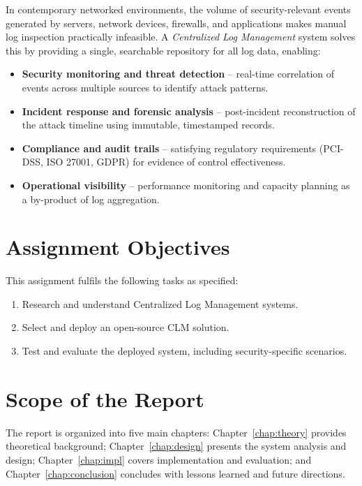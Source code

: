 \documentclass[12pt,a4paper]{report}
\begin{document}
In contemporary networked environments, the volume of security-relevant events generated by
servers, network devices, firewalls, and applications makes manual log inspection practically
infeasible.
A \textit{Centralized Log Management} system solves this by providing a single, searchable
repository for all log data, enabling:

\begin{itemize}[leftmargin=1.5em]
    \item \textbf{Security monitoring and threat detection} -- real-time correlation of events
          across multiple sources to identify attack patterns.
    \item \textbf{Incident response and forensic analysis} -- post-incident reconstruction of the
          attack timeline using immutable, timestamped records.
    \item \textbf{Compliance and audit trails} -- satisfying regulatory requirements
          (PCI-DSS, ISO 27001, GDPR) for evidence of control effectiveness.
    \item \textbf{Operational visibility} -- performance monitoring and capacity planning as a
          by-product of log aggregation.
\end{itemize}

\section{Assignment Objectives}

This assignment fulfils the following tasks as specified:
\begin{enumerate}[leftmargin=1.5em]
    \item Research and understand Centralized Log Management systems.
    \item Select and deploy an open-source CLM solution.
    \item Test and evaluate the deployed system, including security-specific scenarios.
\end{enumerate}

\section{Scope of the Report}

The report is organized into five main chapters:
Chapter~\ref{chap:theory} provides theoretical background;
Chapter~\ref{chap:design} presents the system analysis and design;
Chapter~\ref{chap:impl} covers implementation and evaluation;
and Chapter~\ref{chap:conclusion} concludes with lessons learned and future directions.
\end{document}
